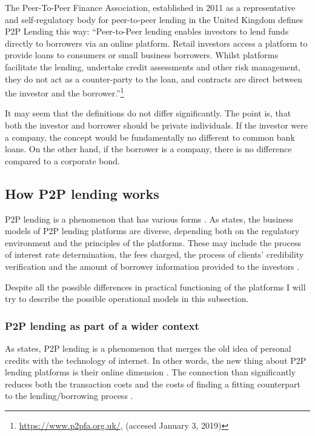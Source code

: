 The Peer-To-Peer Finance Association, established in 2011 as a representative and self-regulatory body for peer-to-peer lending in the United Kingdom defines P2P Lending this way: “Peer-to-Peer lending enables investors to lend funds directly to borrowers via an online platform. Retail investors access a platform to provide loans to consumers or small business borrowers.  Whilst platforms facilitate the lending, undertake credit assessments and other risk management, they do not act as a counter-party to the loan, and contracts are direct between the investor and the borrower.”\footnote{\url{https://www.p2pfa.org.uk/}, (accesed January 3, 2019)}

It may seem that the definitions do not differ significantly. The point is, that both the investor and borrower should be private individuals. If the investor were a company, the concept would be fundamentally no different to common bank loans. On the other hand, if the borrower is a company, there is no difference compared to a corporate bond.

\subsection{How P2P lending works}

P2P lending is a phenomenon that has various forms \cite[]{Bachmann2011, Chaffee2012, Fong2015}. As \cite{Kirby2014} states, the business models of P2P lending platforms are diverse, depending both on the regulatory environment and the principles of the platforms. These may include the process of interest rate determination, the fees charged, the process of clients' credibility verification and the amount of borrower information provided to the investors \cite[]{Bachmann2011}.

Despite all the possible differences in practical functioning of the platforms I will try to describe the possible operational models in this subsection.

\subsubsection{P2P lending as part of a wider context}

As \cite{Herrero-Lopez2009} states, P2P lending is a phenomenon that merges the old idea of personal credits with the technology of internet. In other words, the new thing about P2P lending platforms is their online dimension \cite[]{Chaffee2012}. The connection than significantly reduces both the transaction costs and the costs of finding a fitting counterpart to the lending/borrowing process \cite[]{Chaffee2012, Kirby2014}.

